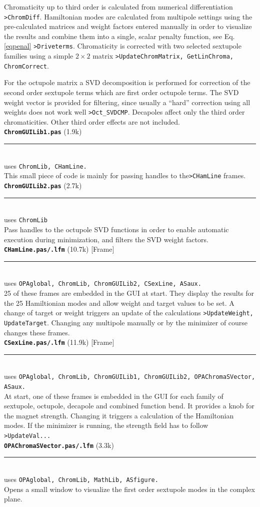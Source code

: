 \documentclass[12pt]{article}
\newcommand\code[1]{{\tt #1}}
\newcommand\opamodule[3]{{\bf \tt #1} #2\\  \rule[3pt]{\textwidth}{0.2pt} \\ {\scriptsize uses \tt  #3}\\[1ex]}
\begin{document}
Chromaticity up to third order is calculated from numerical differentiation \code{>ChromDiff}. Hamiltonian modes are calculated from multipole settings using the pre-calculated matrices and weight factors entered manually in order to visualize the results and combine them into a single, scalar penalty function, see Eq.\ref{eqpenal} \code{>Driveterms}. Chromaticity is corrected with two selected sextupole families using a simple $2\times 2$ matrix \code{>UpdateChromMatrix, GetLinChroma, ChromCorrect}.

For the octupole matrix a SVD decomposition is performed for correction of the second order sextupole terms which are first order octupole terms. The SVD weight vector is provided for filtering, since usually a ``hard'' correction using all weights does not work well \code{>Oct\_SVDCMP}.
Decapoles affect only the third order chromaticities. Other third order effects are not included.\\

\opamodule{ChromGUILib1.pas}{(1.9k)}{ChromLib, CHamLine.}
This small piece of code is mainly for passing handles to the\code{>CHamLine} frames.\\

\opamodule{ChromGUILib2.pas}{(2.7k)}{ChromLib}
Pass handles to the octupole SVD functions in order to enable automatic execution during minimization, and filters the SVD weight factors.\\

\opamodule{CHamLine.pas/.lfm}{(10.7k) [Frame]}{OPAglobal, ChromLib, ChromGUILib2, CSexLine, ASaux.}
25 of these frames are embedded in the GUI at start. They display the results for the 25 Hamiltionian modes and allow weight and target values to be set. A change of target or weight triggers an update of the calculations \code{>UpdateWeight, UpdateTarget}. Changing any multipole manually or by the minimizer of course changes these frames.\\

\opamodule{CSexLine.pas/.lfm}{(11.9k) [Frame]}{OPAglobal, ChromLib, ChromGUILib1, ChromGUILib2, OPAChromaSVector, ASaux.}
At start, one of these frames is embedded in the GUI for each family of sextupole, octupole, decapole and combined function bend. It provides a knob for the magnet strength. Changing it triggers a calculation of the Hamiltonian modes. If the minimizer is running, the strength field has to follow \code{>UpdateVal...}\\

\opamodule{OPAChromaSVector.pas/.lfm}{(3.3k)}{OPAglobal, ChromLib, MathLib, ASfigure.}
Opens a small window to visualize the first order sextupole modes in the complex plane.
\end{document}
